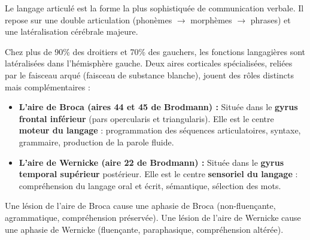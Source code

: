 \documentclass[11pt]{article}
\newcommand{\cle}[1]{{\popxbold\color{popdark}#1}}
\begin{document}
Le langage articulé est la forme la plus sophistiquée de communication verbale. Il repose sur une double articulation (phonèmes $\to$ morphèmes $\to$ phrases) et une latéralisation cérébrale majeure.

\begin{propriete}
Chez plus de 90\% des droitiers et 70\% des gauchers, les fonctions langagières sont \cle{latéralisées dans l'hémisphère gauche}. Deux aires corticales spécialisées, reliées par le \cle{faisceau arqué} (faisceau de substance blanche), jouent des rôles distincts mais complémentaires :
\begin{itemize}
\item \textbf{L'aire de Broca (aires 44 et 45 de Brodmann) :} Située dans le \textbf{gyrus frontal inférieur} (pars opercularis et triangularis). Elle est le centre \textbf{moteur du langage} : programmation des séquences articulatoires, syntaxe, grammaire, production de la parole fluide.
\item \textbf{L'aire de Wernicke (aire 22 de Brodmann) :} Située dans le \textbf{gyrus temporal supérieur} postérieur. Elle est le centre \textbf{sensoriel du langage} : compréhension du langage oral et écrit, sémantique, sélection des mots.
\end{itemize}
Une lésion de l'aire de Broca cause une \cle{aphasie de Broca} (non-fluençante, agrammatique, compréhension préservée). Une lésion de l'aire de Wernicke cause une \cle{aphasie de Wernicke} (fluençante, paraphasique, compréhension altérée).
\end{propriete}
\end{document}
